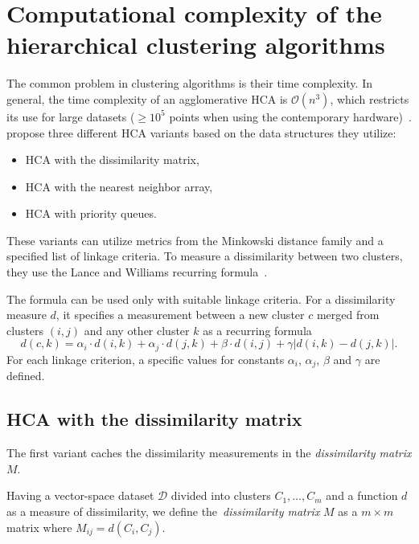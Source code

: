 \section{Computational complexity of the hierarchical clustering algorithms}
\label{sec01:hca}

The common problem in clustering algorithms is their time complexity. In general, the time complexity of an agglomerative HCA is $\mathcal{O}(n^3)$, which restricts its use for large datasets ($\geq10^5$ points when using the contemporary hardware)~\cite{sasirekha2013agglomerative}. \citet{day1984efficient} propose three different HCA variants based on the data structures they utilize:
\begin{itemize}
	\item HCA with the dissimilarity matrix,
	\item HCA with the nearest neighbor array,
	\item HCA with priority queues.
\end{itemize}

These variants can utilize metrics from the Minkowski distance family and a specified list of linkage criteria. To measure a dissimilarity between two clusters, they use the Lance and Williams recurring formula~\cite{lance1967general,lance1967general2}. 

The formula can be used only with suitable linkage criteria. For a dissimilarity measure $d$, it specifies a measurement between a new cluster $c$ merged from clusters $(i,j)$ and any other cluster $k$ as a recurring formula
$$ d(c,k) = \alpha_i\cdot d(i,k) + \alpha_j\cdot d(j,k) + \beta \cdot d(i,j) + \gamma|d(i,k)-d(j,k)|.$$
For each linkage criterion, a specific values for constants $\alpha_i$, $\alpha_j$, $\beta$ and $\gamma$ are defined. 

\subsection{HCA with the dissimilarity matrix}

The first variant caches the dissimilarity measurements in the \emph{dissimilarity matrix} $M$.

\begin{defn}
	Having a vector-space dataset $\mathcal{D}$ divided into clusters $C_1,\dots,C_m$ and a function $d$ as a measure of dissimilarity, we define the~\emph{dissimilarity matrix} $M$ as a $m\times m$ matrix where $M_{ij} = d(C_i,C_j)$.
	\label{def01:dismat}
\end{defn}

